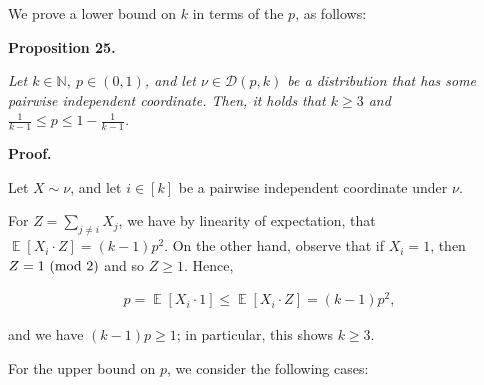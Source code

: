 We prove a lower bound on $k$ in terms of the $p$, as follows:\par





\par\medskip\noindent\textbf{
\textbf{Proposition 25}\textbf{.}
}\par



\emph{Let $k\in\mathbb{N},\ p\in(0,1)$, and let $\nu\in\mathcal{D}(p,k)$ be a distribution that has some pairwise independent coordinate.
Then, it holds that $k\geqslant 3$ and $\frac{1}{k-1}\leqslant p\leqslant 1-\frac{1}{k-1}$.}\par






\par\medskip\noindent\textbf{Proof.}\par




Let $X\sim\nu$, and let $i\in[k]$ be a pairwise independent coordinate under $\nu$.\par




For $Z=\sum_{j\not=i}X_{j}$, we have by linearity of expectation, that $\mathop{\mathbb{E}}\left[X_{i}\cdot Z\right]=(k-1)p^{2}$.
On the other hand, observe that if $X_{i}=1$, then $Z=1\textnormal{ (mod 2)}$ and so $Z\geqslant 1$.
Hence,\par


\[\begin{gathered}
p=\mathop{\mathbb{E}}\left[X_{i}\cdot 1\right]\leqslant\mathop{\mathbb{E}}\left[X_{i}\cdot Z\right]=(k-1)p^{2},
\end{gathered}\]


and we have $(k-1)p\geqslant 1$; in particular, this shows $k\geqslant 3$.\par





For the upper bound on $p$, we consider the following cases:\par


